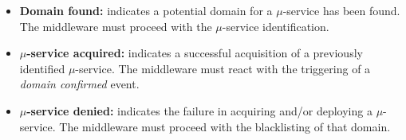 \begin{itemize}
	
	\item \textbf{Domain found:} indicates a potential domain for a $\mu$-service has been found. The middleware must proceed with the $\mu$-service identification.	
	
	\item \textbf{$\mu$-service acquired:} indicates a successful acquisition of a previously identified $\mu$-service. The middleware must react with the triggering of a \textit{domain confirmed} event.
	
	\item \textbf{$\mu$-service denied:} indicates the failure in acquiring and/or deploying a $\mu$-service. The middleware must proceed with the blacklisting of that domain. 
	
\end{itemize}






